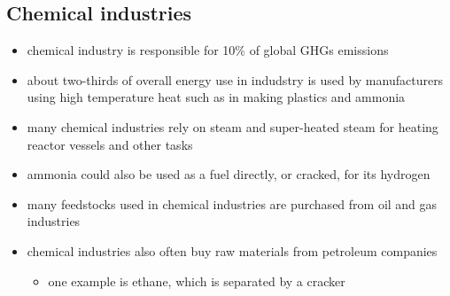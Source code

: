 \subsection{Chemical industries}
\begin{itemize}
	\item chemical industry is responsible for 10\% of global GHGs
	emissions
	\item about two-thirds of overall energy use in indudstry is used by
	manufacturers using high temperature heat such as in making plastics
	and ammonia
	\item many chemical industries rely on steam and super-heated steam
	for heating reactor vessels and other tasks
	\item ammonia could also be used as a fuel directly, or cracked, for
	its hydrogen
	\item many feedstocks used in chemical industries are purchased from
	oil and gas industries
	\item chemical industries also often buy raw materials from petroleum
	companies
	\begin{itemize}
		\item one example is ethane, which is separated by a cracker
	\end{itemize}
\end{itemize}

